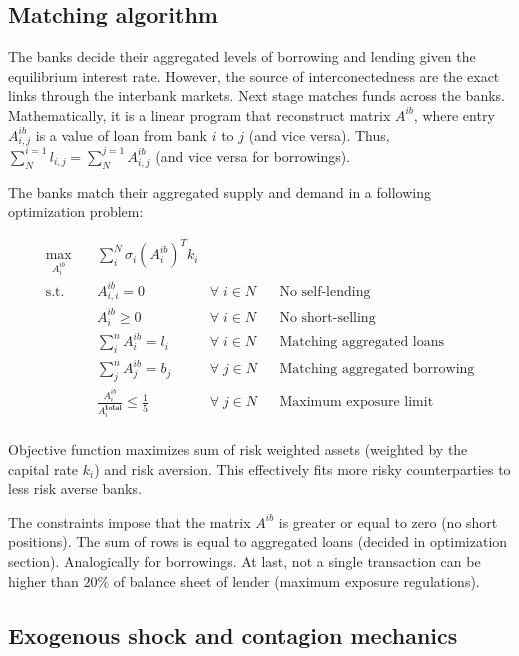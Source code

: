 \documentclass{article}
\begin{document}
\subsection*{Matching algorithm}

The banks decide their aggregated levels of borrowing and lending given the equilibrium interest rate. However, the source of interconectedness are the exact links through the interbank markets. Next stage matches funds across the banks. Mathematically, it is a linear program that reconstruct matrix $A^{ib}$, where entry $A^{ib}_{i,j}$ is a value of loan from bank $i$ to $j$ (and vice versa). Thus, $\sum_{N}^{i=1} l_{i,j} = \sum_{N}^{j=1} A^{ib}_{i,j}$ (and vice versa for borrowings).

The banks match their aggregated supply and demand in a following optimization problem:

\begin{equation}
  \begin{aligned}
  \max_{A^{ib}_i} \quad & \sum_{i}^{N} \sigma_i (A^{ib}_i)^T k_i\\
  \textrm{s.t.} \quad & A^{ib}_{i,i} = 0 & \forall \; i \in N && \text{No self-lending}\\
    & A^{ib}_i \geq 0 & \forall \; i \in N && \text{No short-selling}\\
    & \sum_i^n A^{ib}_i = l_i & \forall \; i \in N && \text{Matching aggregated loans}\\
    & \sum_j^n A^{ib}_j = b_j & \forall \; j \in N && \text{Matching aggregated borrowing}\\ 
    & \frac{A^{ib}_i}{A^{\textbf{total}}_i} \leq \frac{1}{5} & \forall \; j \in N && \text{Maximum exposure limit}\\ 
  \end{aligned}
\end{equation}

Objective function maximizes sum of risk weighted assets  (weighted by the capital rate $k_i$) and risk aversion. This effectively fits more risky counterparties to less risk averse banks.

The constraints impose that the matrix $A^{ib}$ is greater or equal to zero (no short positions). The sum of rows is equal to aggregated loans (decided in optimization section). Analogically for borrowings. At last, not a single transaction can be higher than $20\%$ of balance sheet of lender (maximum exposure regulations).
    
\subsection*{Exogenous shock and contagion mechanics}
\end{document}
